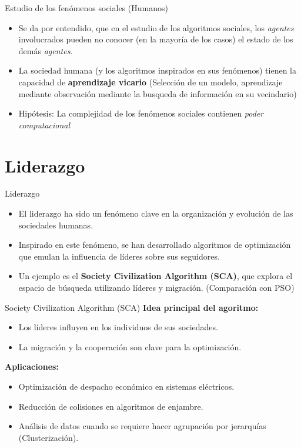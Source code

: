 \documentclass{beamer}
\begin{document}
\begin{frame}{Estudio de los fenómenos sociales (Humanos)}
\begin{itemize}
    \item Se da por entendido, que en el estudio de los algoritmos sociales, los \textit{agentes} involucrados pueden no conocer (en la mayoría de los casos) el estado de los demás \textit{agentes}.
    \item La sociedad humana (y los algoritmos inspirados en sus fenómenos) tienen la capacidad de \textbf{aprendizaje vicario} (Selección de un modelo, aprendizaje mediante observación mediante la busqueda de información en su vecindario)
    \item Hipótesis: La complejidad de los fenómenos sociales contienen \textit{poder computacional}
\end{itemize}
\end{frame}

\section{Liderazgo}
\begin{frame}{Liderazgo}
    \begin{itemize}
        \item El liderazgo ha sido un fenómeno clave en la organización y evolución de las sociedades humanas.
        \item Inspirado en este fenómeno, se han desarrollado algoritmos de optimización que emulan la influencia de líderes sobre sus seguidores.
        \item Un ejemplo es el \textbf{Society Civilization Algorithm (SCA)}, que explora el espacio de búsqueda utilizando líderes y migración. (Comparación con PSO)
    \end{itemize}
\end{frame}


\begin{frame}{Society Civilization Algorithm (SCA)}
    \textbf{Idea principal del agoritmo:} 
    \begin{itemize}
        \item Los líderes influyen en los individuos de sus sociedades.
        \item La migración y la cooperación son clave para la optimización.
    \end{itemize}
    
    \textbf{Aplicaciones:}
    \begin{itemize}
        \item Optimización de despacho económico en sistemas eléctricos.
        \item Reducción de colisiones en algoritmos de enjambre.
        \item Análisis de datos cuando se requiere hacer agrupación por jerarquías (Clusterización).
    \end{itemize}
\end{frame}
\end{document}
